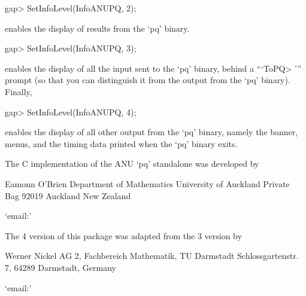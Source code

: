\beginexample
gap> SetInfoLevel(InfoANUPQ, 2);
\endexample

enables the display of results from the `pq'  binary.

\beginexample
gap> SetInfoLevel(InfoANUPQ, 3);
\endexample

enables the display of all the input sent to the `pq'  binary,  behind  a
```ToPQ> ''' prompt (so that you can distinguish it from the output  from
the `pq' binary). Finally,

\beginexample
gap> SetInfoLevel(InfoANUPQ, 4);
\endexample

enables the display of all other output from the `pq' binary, namely  the
banner, menus, and the timing data printed when the `pq' binary exits.


The C implementation of the ANU `pq' standalone was developed by

\begintt
Eamonn O'Brien
Department of Mathematics
University of Auckland
Private Bag 92019
Auckland
New Zealand
\endtt

{}`email:' 

The {\GAP} 4 version of this package was adapted from the {\GAP} 3
version by  

\begintt
Werner Nickel
AG 2, Fachbereich Mathematik, TU Darmstadt
Schlossgartenstr. 7, 64289 Darmstadt, Germany
\endtt

{}`email:' 

